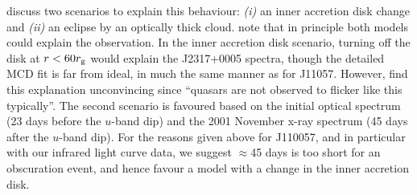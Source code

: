 \documentclass[11pt,a4paper]{article}
\begin{document}
\citet{Guo2016} discuss two scenarios to explain this behaviour: {\it
(i)} an inner accretion disk change and {\it (ii)} an eclipse by an
optically thick cloud. \citet{Guo2016} note that in principle both
models could explain the observation. In the inner accretion disk
scenario, turning off the disk at $r < 60 r_{\rm g}$ would explain the
J2317+0005 spectra, though the detailed MCD fit is far from ideal, in much the same manner as for J11057. However,
\citet{Guo2016} find this explanation unconvincing since ``quasars are
not observed to flicker like this typically''.  The second scenario is
favoured based on the initial optical spectrum (23 days before the
$u$-band dip) and the 2001 November x-ray spectrum (45 days after the
$u$-band dip).  For the reasons given above for J110057, and in
particular with our infrared light curve data, we suggest $\approx$45
days is too short for an obscuration event, and hence favour a model
with a change in the inner accretion disk.




\end{document}
